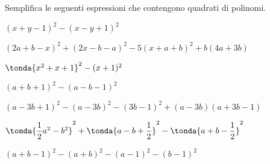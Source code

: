\begin{esercizio}
\begin{enumeratea}
\end{enumeratea}
\end{esercizio}

\begin{esercizio}[*]
\label{ese:11.14}
Semplifica le seguenti espressioni che contengono quadrati di polinomi.

\begin{enumeratea}
\item \((x+y-1)^{2}-(x-y+1)^{2}\)
\item \((2a+b-x)^{2}+(2x-b-a)^{2}-5(x+a+b)^{2}+b(4a+3b)\)
\item \(\tonda{x^{2}+x+1}^{2}-(x+1)^{2}\)
\item \((a+b+1)^{2}-(a-b-1)^{2}\)
% 
% 
\item \((a-3b+1)^{2}-(a-3b)^{2}-(3b-1)^{2}+(a-3b)(a+3b-1)\)
\item 
\(\tonda{\dfrac{1}{2}a^{2}-b^{2}}^{2}+\tonda{a-b+\dfrac{1}{2}}^{2}
-\tonda{a+b-\dfrac{1}{2}}^{2}\)
\item \((a+b-1)^{2}-(a+b)^{2}-(a-1)^{2}-(b-1)^{2}\)
\end{enumeratea}
\end{esercizio}

